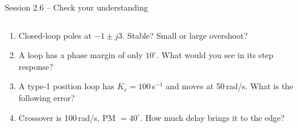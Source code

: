 \documentclass[aspectratio=169,10pt]{beamer}
\begin{document}
\begin{frame}{Session 2.6 -- Check your understanding}
\begin{columns}[T]
\begin{keybox}
\begin{enumerate}
  \item Closed-loop poles at $-1\pm j3$. Stable? Small or large overshoot?
  \item A loop has a phase margin of only $10^\circ$. What would you see in its step response?
  \item A type-1 position loop has $K_v=100$\,s$^{-1}$ and moves at 50\,rad/s. What is the following error?
  \item Crossover is 100\,rad/s, PM $=40^\circ$. How much delay brings it to the edge?
\end{enumerate}
\end{keybox}
\centering
{}
\end{columns}
\end{frame}
\end{document}
